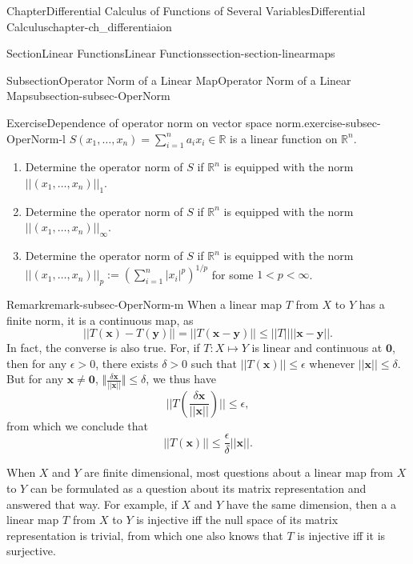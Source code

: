\documentclass[oneside,10pt,]{book}
\numberwithin{equation}{section}
\newcommand{\bbR}{\mathbb{R}}
\newcommand{\lt}{<}
\begin{document}
\begin{chapterptx}{Chapter}{Differential Calculus of Functions of Several Variables}{}{Differential Calculus}{}{}{chapter-ch_differentiaion}
\begin{sectionptx}{Section}{Linear Functions}{}{Linear Functions}{}{}{section-section-linearmaps}
\begin{subsectionptx}{Subsection}{Operator Norm of a Linear Map}{}{Operator Norm of a Linear Map}{}{}{subsection-subsec-OperNorm}
\begin{inlineexercise}{Exercise}{Dependence of operator norm on vector space norm.}{exercise-subsec-OperNorm-l}%
\(S(x_{1},\ldots, x_{n})=\sum_{i=1}^{n}a_{i}x_{i} \in \bbR\) is a linear function on \(\bbR^{n}\).%
%
\begin{enumerate}[label=(\alph*).]
\item{}Determine the operator norm of \(S\) if \(\bbR^{n}\) is equipped with the norm \(||(x_{1}, \ldots, x_{n})||_{1}\).%
\item{}Determine the operator norm of \(S\) if \(\bbR^{n}\) is equipped with the norm \(||(x_{1}, \ldots, x_{n})||_{\infty}\).%
\item{}Determine the operator norm of \(S\) if \(\bbR^{n}\) is equipped with the norm \(||(x_{1}, \ldots, x_{n})||_{p}:= \left( \sum_{i=1}^{n}|x_{i}|^{p}\right)^{1/p}\) for some \(1 \lt p \lt 
\infty\).%
\end{enumerate}
\end{inlineexercise}%
\begin{remark}{Remark}{}{remark-subsec-OperNorm-m}%
When a linear map \(T\) from \(X\) to \(Y\) has a finite norm, it is a continuous map, as%
\begin{equation*}
||T({\mathbf x}) -T({\mathbf y})||=||T({\mathbf x}- {\mathbf y})||\le ||T|| || {\mathbf x}- {\mathbf y}||.
\end{equation*}
In fact, the converse is also true. For, if \(T: X\mapsto Y\) is linear and continuous at \(\mathbf 0\), then for any \(\epsilon >0\), there exists \(\delta>0\) such that \(||T({\mathbf x})||\le \epsilon\) whenever \(||{\mathbf x}||\le \delta\). But for any \({\mathbf x}\ne {\mathbf 0}\), \(\Vert \frac{\delta {\mathbf x}}{||{\mathbf x}||} \Vert
\le \delta\), we thus have%
\begin{equation*}
||T(\frac{\delta {\mathbf x}}{||{\mathbf x}||})||\le \epsilon,
\end{equation*}
from which we conclude that%
\begin{equation*}
||T({\mathbf x})||\le  \frac{\epsilon}{\delta} ||{\mathbf x}||.
\end{equation*}
\end{remark}
When \(X\) and \(Y\) are finite dimensional, most questions about a linear map from \(X\) to \(Y\) can be formulated as a question about its matrix representation and answered that way. For example, if \(X\) and \(Y\) have the same dimension, then a a linear map \(T\) from \(X\) to \(Y\) is injective iff the null space of its matrix representation is trivial, from which one also knows that \(T\) is injective iff it is surjective.%

\end{subsectionptx}
\end{sectionptx}
\end{chapterptx}
\end{document}
